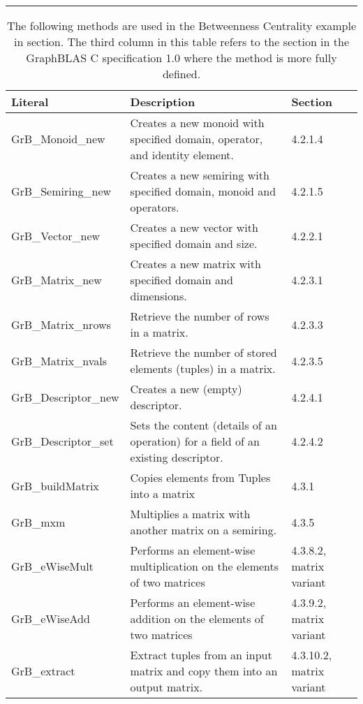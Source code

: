 \begin{table*}[h]
\hrule
\begin{center}
\caption{The following methods are used in the Betweenness Centrality example in section.  The third 
column in this table refers to the section in the GraphBLAS C specification 1.0 where the method is more fully defined.}
\label{Tab:GrBmethods}
\begin{tabular}{lll}
Literal                 & Description  & Section \\
\hline
GrB\_Monoid\_new      & Creates a new monoid with specified domain, operator, and identity element. &  4.2.1.4 \\
GrB\_Semiring\_new    & Creates a new semiring with specified domain, monoid and operators.           & 4.2.1.5 \\
GrB\_Vector\_new        & Creates a new vector with specified domain and size.                                      & 4.2.2.1 \\
GrB\_Matrix\_new         & Creates a new matrix with specified domain and dimensions.                         &  4.2.3.1 \\
GrB\_Matrix\_nrows      & Retrieve the number of rows in a matrix.                                                          &  4.2.3.3 \\
GrB\_Matrix\_nvals       & Retrieve the number of stored elements (tuples) in a matrix.                            & 4.2.3.5 \\
GrB\_Descriptor\_new   & Creates a new (empty) descriptor.                                                                    &  4.2.4.1 \\
GrB\_Descriptor\_set     & Sets the content (details of an operation) for a field of an existing descriptor.  &  4.2.4.2 \\
GrB\_buildMatrix            & Copies elements from Tuples into a matrix                                                       &  4.3.1 \\
GrB\_mxm                     & Multiplies a matrix with another matrix on a semiring.                                       &  4.3.5 \\
GrB\_eWiseMult            & Performs an element-wise multiplication on the elements of two matrices        &  4.3.8.2, matrix variant  \\
GrB\_eWiseAdd            &  Performs an element-wise addition on the elements of two matrices                &  4.3.9.2, matrix variant \\
GrB\_extract                  & Extract tuples from an input matrix and copy them into an output matrix.          & 4.3.10.2, matrix variant \\

\end{tabular}
\end{center}
\end{table*}
